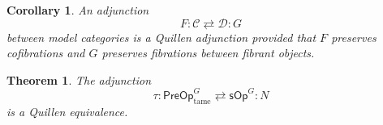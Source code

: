 \documentclass[a4paper,10pt]{article}%
\numberwithin{equation}{section}
\numberwithin{figure}{section}
\newtheorem{theorem}[equation]{Theorem}%
\newtheorem{corollary}[equation]{Corollary}%
\theoremstyle{definition} %
\newcommand{\1}{\ensuremath{\mathbbm 1}}%
\begin{document}


\begin{corollary}\label{SIMPLQUILL COR}
	An adjunction 
\[
	F \colon \mathcal{C}
	\rightleftarrows
	\mathcal{D} \colon G
\]
	between model categories is a Quillen adjunction
	provided that $F$ preserves cofibrations
	and $G$ preserves fibrations between fibrant objects.
\end{corollary}



\begin{theorem}\label{PREQUIEQUIV THM}
	The adjunction
\begin{equation}\label{PREQUIEQUIV EQ}
	\tau \colon \mathsf{PreOp}^G_{\text{tame}}
	\rightleftarrows 
	\mathsf{sOp}^G \colon N
\end{equation}
	is a Quillen equivalence.
\end{theorem}
\end{document}
